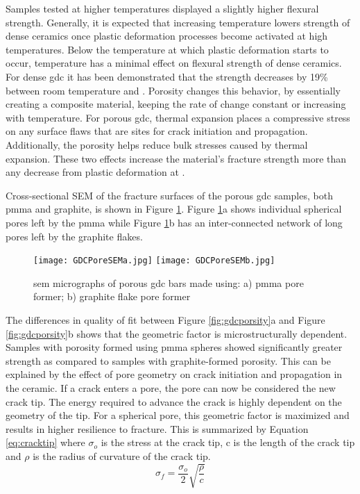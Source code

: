 Samples tested at higher temperatures displayed a slightly higher flexural strength.
Generally, it is expected that increasing temperature lowers strength of dense ceramics once plastic deformation processes become activated at high temperatures.\cite{Davidge1970}
Below the temperature at which plastic deformation starts to occur, temperature has a minimal effect on flexural strength of dense ceramics.
For dense \gls{gdc} it has been demonstrated that the strength decreases by 19\% between room temperature and .\cite{Mogensen2000}
Porosity changes this behavior, by essentially creating a composite material, keeping the rate of change constant or increasing with temperature.\cite{Giraud2008}
For porous \gls{gdc}, thermal expansion places a compressive stress on any surface flaws that are sites for crack initiation and propagation.
Additionally, the porosity helps reduce bulk stresses caused by thermal expansion.
These two effects increase the material's fracture strength more than any decrease from plastic deformation at .

Cross-sectional SEM of the fracture surfaces of the porous \gls{gdc} samples, both \gls{pmma} and graphite, is shown in Figure \ref{fig:GDCPoreSEM}.
Figure \ref{fig:GDCPoreSEM}a shows individual spherical pores left by the \gls{pmma} while Figure \ref{fig:GDCPoreSEM}b has an inter-connected network of long pores left by the graphite flakes.
\begin{figure}
    \texttt{[image: GDCPoreSEMa.jpg]}
    \texttt{[image: GDCPoreSEMb.jpg]}
    \caption{\Gls{sem} micrographs of porous \gls{gdc} bars made using: a) \gls{pmma} pore former; b) graphite flake pore former}
    \label{fig:GDCPoreSEM}
\end{figure}

The differences in quality of fit between Figure \ref{fig:gdcporsity}a and Figure \ref{fig:gdcporsity}b shows that the geometric factor is microstructurally dependent.
Samples with porosity formed using \gls{pmma} spheres showed significantly greater strength as compared to samples with graphite-formed porosity.
This can be explained by the effect of pore geometry on crack initiation and propagation in the ceramic.
If a crack enters a pore, the pore can now be considered the new crack tip.
The energy required to advance the crack is highly dependent on the geometry of the tip.
For a spherical pore, this geometric factor is maximized and results in higher resilience to fracture.
This is summarized by Equation \ref{eq:cracktip} where \(\sigma_{o}\) is the stress at the crack tip, c is the length of the crack tip and \(\rho\) is the radius of curvature of the crack tip.\cite{Carter2007}
\begin{equation}
    \sigma_{f} = \frac{\sigma_{o}}{2}\sqrt{\frac{\rho}{c}}
    \label{eq:cracktip}
\end{equation}

